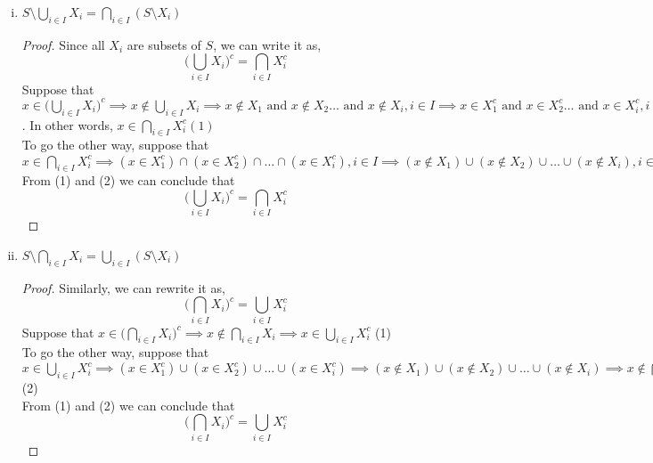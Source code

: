 \documentclass[10pt,letterpaper]{article}
\begin{document}
	\begin{enumerate}[(i)]
		\item $S \setminus \displaystyle{\bigcup_{i \in I}}X_i = \displaystyle{\bigcap_{i \in I}}(S \setminus X_i)$ 
\begin{proof}
	Since all $X_i$ are subsets of $S$, we can write it as,
		$$\bigg(\displaystyle{\bigcup_{i \in I}}X_i\bigg)^c = \displaystyle{\bigcap_{i \in I}}X_i^c$$
		Suppose that $x \in \bigg(\displaystyle{\bigcup_{i \in I}}X_i\bigg)^c \implies
		x \not\in \displaystyle{\bigcup_{i \in I}}X_i \implies 
		x \not\in X_1 \text{ and } x \not\in X_2 \ldots \text{ and } x \not\in X_i, i \in I \implies 
		x \in X_1^c \text{ and } x \in X_2^c \ldots \text{ and } x \in X_i^c, i \in I$. In other words,
		$x \in \displaystyle{\bigcap_{i \in I}}X_i^c (1)$ \\
		To go the other way, suppose that $x \in \displaystyle{\bigcap_{i \in I}}X_i^c 
		\implies (x \in X_1^c) \cap (x \in X_2^c) \cap \ldots \cap (x \in X_i^c), i \in I
		\implies (x \not\in X_1) \cup (x \not\in X_2) \cup \ldots \cup (x \not\in X_i), i \in I
		\implies x \not\in \displaystyle{\bigcup_{i \in I}X_i} \implies 
		x \in \bigg(\displaystyle{\bigcup_{i \in I}X_i}\bigg)^c (2)$ \\
		From (1) and (2) we can conclude that 
		$$\bigg(\displaystyle{\bigcup_{i \in I}}X_i\bigg)^c = \displaystyle{\bigcap_{i \in I}}X_i^c$$
\end{proof}
		\item $S \setminus \displaystyle{\bigcap_{i \in I}}X_i = \displaystyle{\bigcup_{i \in I}}(S \setminus X_i)$ 
\begin{proof}
	Similarly, we can rewrite it as,
		$$\bigg(\displaystyle{\bigcap_{i \in I}}X_i\bigg)^c = \displaystyle{\bigcup_{i \in I}}X_i^c$$
		Suppose that $x \in \bigg(\displaystyle{\bigcap_{i \in I}}X_i\bigg)^c \implies 
		x \not\in \displaystyle{\bigcap_{i \in I}}X_i \implies 
		x \in \displaystyle{\bigcup_{i \in I}}X_i^c$ (1) \\
		To go the other way, suppose that $x \in \displaystyle{\bigcup_{i \in I}}X_i^c \implies
		(x \in X_1^c) \cup (x \in X_2^c) \cup \ldots \cup (x \in X_i^c) \implies 
		(x \not\in X_1) \cup (x \not\in X_2) \cup \ldots \cup (x \not\in X_i) \implies
		x \not\in \displaystyle{\bigcap_{i \in I}}X_i \implies
		x \in \bigg(\displaystyle{\bigcap_{i \in I}}X_i\bigg)^c 
		$ (2) \\
		From (1) and (2) we can conclude that
		$$\bigg(\displaystyle{\bigcap_{i \in I}}X_i\bigg)^c = \displaystyle{\bigcup_{i \in I}}X_i^c$$
\end{proof}

\end{enumerate}
\end{document}
